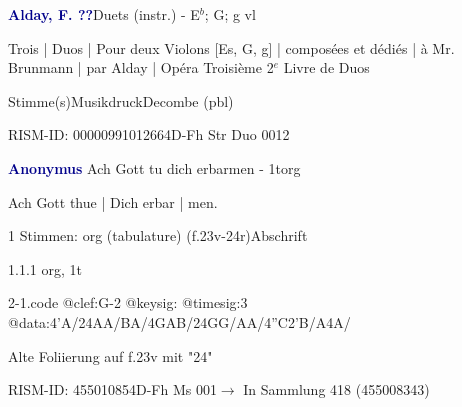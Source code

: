 \documentclass[twocolumn, 12pt]{book}
\begin{document}
\par \vspace{16pt} \textcolor{darkblue}{\textbf{Alday, F.  ??}}\hfillplus{\textbf{[1]}}\newline Duets (instr.) - E$^b$; G; g vl
\par \begin{itshape}Trois | Duos | Pour deux Violons [Es, G, g] | composées et dédiés | à Mr. Brunmann | par Alday | Opéra Troisième 2$^e$ Livre de Duos\end{itshape} 
\par \textcolor{darkblue}{}  Stimme(s)\newline Musikdruck\newline Decombe  (pbl)
\par RISM-ID: 00000991012664\newline D-Fh  Str Duo 0012
\par \vspace{16pt} \textcolor{darkblue}{\textbf{Anonymus  }}\hfillplus{\textbf{[2]}}\newline Ach Gott tu dich erbarmen - 1t\newline org
\par \begin{itshape}[f.23v, at left:] Ach Gott thue | Dich erbar | men.\end{itshape} 
\par \textcolor{darkblue}{}  1 Stimmen: org (tabulature)  (f.23v-24r)\newline Abschrift
\par 1.1.1  org, 1t  
\begin{filecontents*}{2-1.code}
@clef:G-2
@keysig:
@timesig:3
@data:4'A/24AA/BA/4GAB/24GG/AA/4''C2'B/A4A/
\end{filecontents*}
\newline %
\par Alte Foliierung auf f.23v mit "24"
\par RISM-ID: 455010854\newline D-Fh  Ms 001\newline $\rightarrow$ In Sammlung 418 (455008343)
      
\end{document}
